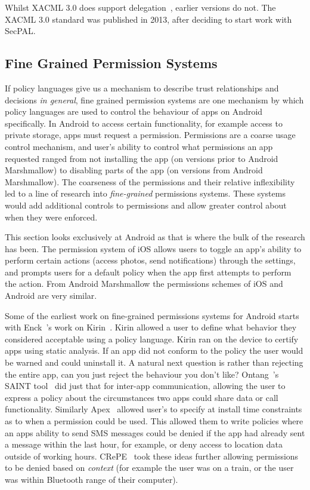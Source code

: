 \documentclass[thesis.tex]{subfiles}
\begin{document}
Whilst XACML 3.0 does support delegation~\cite{oasis_xacml_2010}, earlier
versions do not. The XACML 3.0 standard was published in 2013, after deciding to
start work with SecPAL.


\subsection{Fine Grained Permission Systems}

If policy languages give us a mechanism to describe trust
relationships and decisions \emph{in general}, fine grained permission
systems are one mechanism by which policy languages are used to
control the behaviour of apps on Android specifically.  In Android to
access certain functionality, for example access to private storage,
apps must request a permission.  Permissions are a coarse usage
control mechanism, and user's ability to control what permissions an
app requested ranged from not installing the app (on versions prior to
Android Marshmallow) to disabling parts of the app (on versions from
Android Marshmallow).  The coarseness of the permissions and their
relative inflexibility led to a line of research into
\emph{fine-grained} permissions systems.  These systems would add
additional controls to permissions and allow greater control about
when they were enforced.

This section looks exclusively at Android as that is where the bulk of
the research has been.  The permission system of iOS allows users to
toggle an app's ability to perform certain actions (access photos,
send notifications) through the settings, and prompts users for a
default policy when the app first attempts to perform the action.
From Android Marshmallow the permissions schemes of iOS and Android
are very similar.

Some of the earliest work on fine-grained permissions systems for
Android starts with Enck~\etal's work on
Kirin~\cite{enck_lightweight_2009}.  Kirin allowed a user to define
what behavior they considered acceptable using a policy language.
Kirin ran on the device to certify apps using static analysis.  If an
app did not conform to the policy the user would be warned and could
uninstall it.  A natural next question is rather than rejecting the
entire app, can you just reject the behaviour you don't like?
Ontang~\etal's SAINT tool~\cite{ongtang_semantically_2012} did just
that for inter-app communication, allowing the user to express a
policy about the circumstances two apps could share data or call
functionality.  Similarly Apex~\cite{nauman_apex:_2010} allowed user's
to specify at install time constraints as to when a permission could
be used.  This allowed them to write policies where an apps ability to
send SMS messages could be denied if the app had already sent a
message within the last hour, for example, or deny access to location
data outside of working hours.  CRePE~\cite{conti_crepe:_2010} took
these ideas further allowing permissions to be denied based on
\emph{context} (for example the user was on a train, or the user was
within Bluetooth range of their computer).
\end{document}
